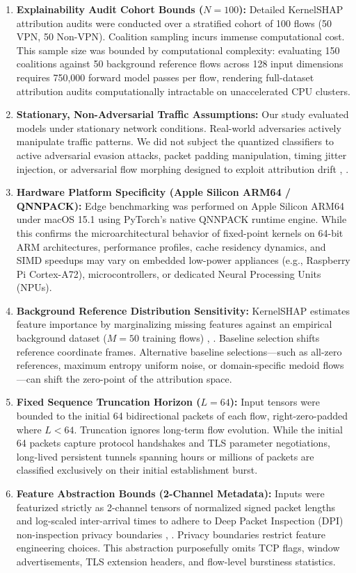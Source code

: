 \documentclass[conference]{IEEEtran}
\begin{document}
\begin{enumerate}
    \item \textbf{Explainability Audit Cohort Bounds ($N = 100$):} Detailed KernelSHAP attribution audits were conducted over a stratified cohort of 100 flows (50 VPN, 50 Non-VPN). Coalition sampling incurs immense computational cost. This sample size was bounded by computational complexity: evaluating 150 coalitions against 50 background reference flows across 128 input dimensions requires 750,000 forward model passes per flow, rendering full-dataset attribution audits computationally intractable on unaccelerated CPU clusters.
    \item \textbf{Stationary, Non-Adversarial Traffic Assumptions:} Our study evaluated models under stationary network conditions. Real-world adversaries actively manipulate traffic patterns. We did not subject the quantized classifiers to active adversarial evasion attacks, packet padding manipulation, timing jitter injection, or adversarial flow morphing designed to exploit attribution drift \cite{b28}, \cite{b31}.
    \item \textbf{Hardware Platform Specificity (Apple Silicon ARM64 / QNNPACK):} Edge benchmarking was performed on Apple Silicon ARM64 under macOS 15.1 using PyTorch's native QNNPACK runtime engine. While this confirms the microarchitectural behavior of fixed-point kernels on 64-bit ARM architectures, performance profiles, cache residency dynamics, and SIMD speedups may vary on embedded low-power appliances (e.g., Raspberry Pi Cortex-A72), microcontrollers, or dedicated Neural Processing Units (NPUs).
    \item \textbf{Background Reference Distribution Sensitivity:} KernelSHAP estimates feature importance by marginalizing missing features against an empirical background dataset ($M = 50$ training flows) \cite{b32}, \cite{b29}. Baseline selection shifts reference coordinate frames. Alternative baseline selections—such as all-zero references, maximum entropy uniform noise, or domain-specific medoid flows—can shift the zero-point of the attribution space.
    \item \textbf{Fixed Sequence Truncation Horizon ($L = 64$):} Input tensors were bounded to the initial 64 bidirectional packets of each flow, right-zero-padded where $L < 64$. Truncation ignores long-term flow evolution. While the initial 64 packets capture protocol handshakes and TLS parameter negotiations, long-lived persistent tunnels spanning hours or millions of packets are classified exclusively on their initial establishment burst.
    \item \textbf{Feature Abstraction Bounds (2-Channel Metadata):} Inputs were featurized strictly as 2-channel tensors of normalized signed packet lengths and log-scaled inter-arrival times to adhere to Deep Packet Inspection (DPI) non-inspection privacy boundaries \cite{b7}, \cite{b8}. Privacy boundaries restrict feature engineering choices. This abstraction purposefully omits TCP flags, window advertisements, TLS extension headers, and flow-level burstiness statistics.

\end{enumerate}
\end{document}
